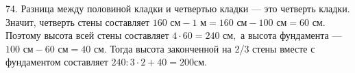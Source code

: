 74. Разница между половиной кладки и четвертью кладки --- это четверть кладки. Значит, четверть стены составляет $160\text{ см}-1\text{ м}=160\text{ см}-100\text{ см}=60\text{ см}.$ Поэтому высота всей стены составляет $4\cdot60=240\text{ см},$ а высота фундамента --- $100\text{ см}-60\text{ см}=40\text{ см}.$ Тогда высота законченной на 2/3 стены вместе с фундаментом составляет $240:3\cdot2+40=200$см.\\
